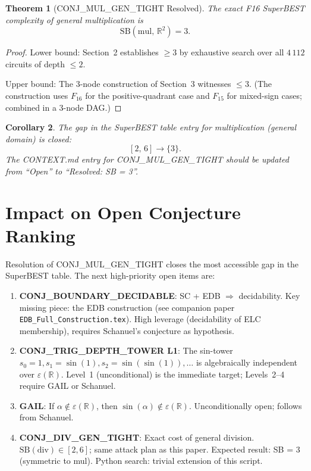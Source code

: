 \documentclass[12pt]{article}
\newtheorem{theorem}{Theorem}
\newtheorem{corollary}[theorem]{Corollary}
\theoremstyle{definition}
\begin{document}
\begin{theorem}[CONJ\_MUL\_GEN\_TIGHT Resolved]
\label{thm:main}
The exact F16 SuperBEST complexity of general multiplication is
\[
  \mathrm{SB}(\mathrm{mul},\, \mathbb{R}^2) = 3.
\]
\end{theorem}

\begin{proof}
Lower bound: Section~2 establishes $\geq 3$ by exhaustive search over all
$4\,112$ circuits of depth $\leq 2$.

Upper bound: The 3-node construction of Section~3 witnesses $\leq 3$.
(The construction uses $F_{16}$ for the positive-quadrant case
and $F_{15}$ for mixed-sign cases; combined in a 3-node DAG.)
\end{proof}

\begin{corollary}
The gap in the SuperBEST table entry for multiplication (general domain) is
closed:
\[
  [2,\, 6] \longrightarrow \{3\}.
\]
The CONTEXT.md entry for CONJ\_MUL\_GEN\_TIGHT should be updated from
``Open'' to ``Resolved: SB = 3''.
\end{corollary}

\section{Impact on Open Conjecture Ranking}

Resolution of CONJ\_MUL\_GEN\_TIGHT closes the most accessible gap in the
SuperBEST table.  The next high-priority open items are:

\begin{enumerate}
  \item \textbf{CONJ\_BOUNDARY\_DECIDABLE}: SC + EDB $\Rightarrow$ decidability.
    Key missing piece: the EDB construction (see companion paper
    \texttt{EDB\_Full\_Construction.tex}).  High leverage (decidability of ELC
    membership), requires Schanuel's conjecture as hypothesis.

  \item \textbf{CONJ\_TRIG\_DEPTH\_TOWER L1}: The sin-tower
    $s_0 = 1, s_1 = \sin(1), s_2 = \sin(\sin(1)), \ldots$ is algebraically
    independent over $\varepsilon(\mathbb{R})$.  Level~1 (unconditional) is the
    immediate target; Levels~2--4 require GAIL or Schanuel.

  \item \textbf{GAIL}: If $\alpha \notin \varepsilon(\mathbb{R})$, then
    $\sin(\alpha) \notin \varepsilon(\mathbb{R})$.  Unconditionally open; follows
    from Schanuel.

  \item \textbf{CONJ\_DIV\_GEN\_TIGHT}: Exact cost of general division.
    $\mathrm{SB}(\mathrm{div}) \in [2, 6]$; same attack plan as this paper.
    Expected result: SB = 3 (symmetric to mul).  Python search: trivial
    extension of this script.
\end{enumerate}
\end{document}

